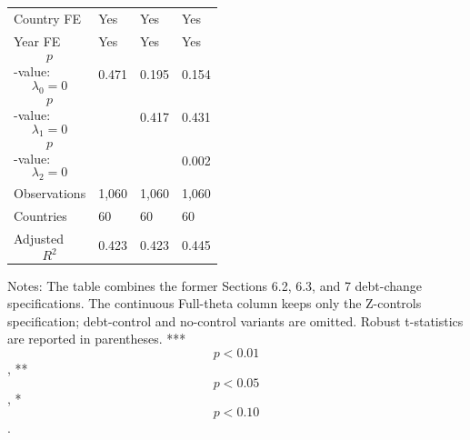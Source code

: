 \begin{table}[H]
\begin{threeparttable}
\begin{tabularx}{\textwidth}{lYYY}
Country FE & Yes & Yes & Yes \\
Year FE & Yes & Yes & Yes \\
$$p$$-value: $$\lambda_0=0$$ & 0.471 & 0.195 & 0.154 \\
$$p$$-value: $$\lambda_1=0$$ &  & 0.417 & 0.431 \\
$$p$$-value: $$\lambda_2=0$$ &  &  & 0.002 \\
Observations & 1,060 & 1,060 & 1,060 \\
Countries & 60 & 60 & 60 \\
Adjusted $$R^2$$ & 0.423 & 0.423 & 0.445 \\
\bottomrule
\end{tabularx}
\begin{tablenotes}[flushleft]\footnotesize
\item Notes: The table combines the former Sections 6.2, 6.3, and 7 debt-change specifications. The continuous Full-theta column keeps only the Z-controls specification; debt-control and no-control variants are omitted. Robust t-statistics are reported in parentheses. *** $$p<0.01$$, ** $$p<0.05$$, * $$p<0.10$$.
\end{tablenotes}
\end{threeparttable}
\end{table}
